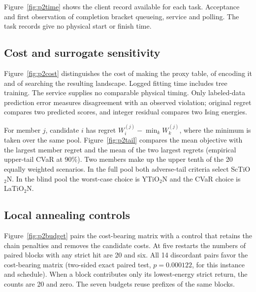 Figure~\ref{fig:p2time} shows the client record available for each task. Acceptance and first observation of completion bracket queueing, service and polling. The task records give no physical start or finish time.

\subsection{Cost and surrogate sensitivity}\label{app:p2risk}
Figure~\ref{fig:p2cost} distinguishes the cost of making the proxy table, of encoding it and of searching the resulting landscape. Logged fitting time includes tree training. The service supplies no comparable physical timing. Only labeled-data prediction error measures disagreement with an observed violation; original regret compares two predicted scores, and integer residual compares two Ising energies.

For member $j$, candidate $i$ has regret $W_i^{(j)}-\min_k W_k^{(j)}$, where the minimum is taken over the same pool. Figure~\ref{fig:p2tail} compares the mean objective with the largest member regret and the mean of the two largest regrets (empirical upper-tail CVaR at 90\%). Two members make up the upper tenth of the 20 equally weighted scenarios. In the full pool both adverse-tail criteria select ScTiO$_2$N. In the blind pool the worst-case choice is YTiO$_2$N and the CVaR choice is LaTiO$_2$N.
\FloatBarrier

\subsection{Local annealing controls}\label{app:p2sa}
Figure~\ref{fig:p2budget} pairs the cost-bearing matrix with a control that retains the chain penalties and removes the candidate costs. At five restarts the numbers of paired blocks with any strict hit are 20 and six. All 14 discordant pairs favor the cost-bearing matrix (two-sided exact paired test, $p=0.000122$, for this instance and schedule). When a block contributes only its lowest-energy strict return, the counts are 20 and zero. The seven budgets reuse prefixes of the same blocks.
\FloatBarrier


